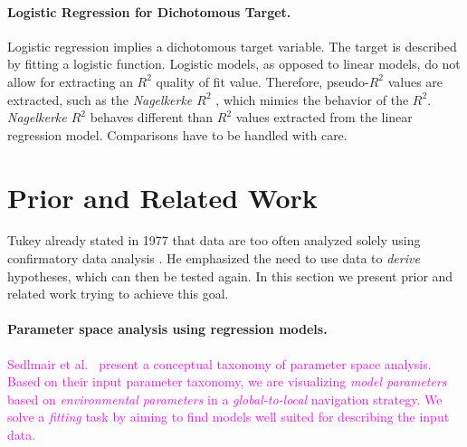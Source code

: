 \documentclass[journal]{style/vgtc} 			          %
\newcommand{\magenta}[1]{\textcolor{magenta}{#1}}
\begin{document}
\paragraph{Logistic Regression for Dichotomous Target.} Logistic regression implies a dichotomous target variable.
The target is described by fitting a logistic function.
Logistic models, as opposed to linear models, do not allow for extracting an $R^2$ quality of fit value.
Therefore, pseudo-$R^2$ values are extracted, such as the \emph{Nagelkerke $R^2$} \cite{Nagelkerke}, which mimics the behavior of the $R^2$.
\emph{Nagelkerke $R^2$} behaves different than $R^2$ values extracted from the linear regression model.
Comparisons have to be handled with care.
\section{Prior and Related Work}
Tukey already stated in 1977 that data are too often analyzed solely using confirmatory data analysis \cite{Tukey}.
He emphasized the need to use data to \emph{derive} hypotheses, which can then be tested again.
In this section we present prior and related work trying to achieve this goal.
\paragraph{Parameter space analysis using regression models.}
\magenta{
Sedlmair et al.~\cite{Sedlmair} present a conceptual taxonomy of parameter space analysis.
Based on their input parameter taxonomy, we are visualizing \emph{model parameters} based on \emph{environmental parameters} in a \emph{global-to-local} navigation strategy.
We solve a \emph{fitting} task by aiming to find models well suited for describing the input data.
}
\end{document}
